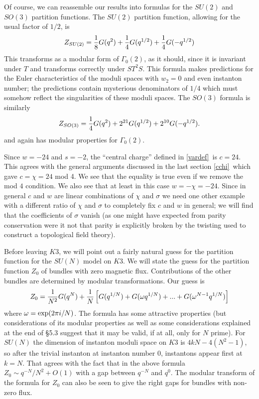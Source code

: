 \documentclass[12pt]{article}
\numberwithin{equation}{section}
\begin{document}
Of course, we can reassemble our results into formulas for the $SU(2)$
and $SO(3)$ partition functions.
The $SU(2)$ partition function, allowing for the usual factor of $1/2$,
is
%
\begin{equation}
  \label{plon}
  Z_{SU(2)}={1\over 8}G(q^2)+{1\over 4}G(q^{1/2})+ {1\over 4}G(-q^{1/2})
\end{equation}
%
This transforms as a modular form of $\Gamma_0(2)$, as it should,
since it is invariant under $T$ and transforms correctly under $ST^2S$.
This formula makes predictions for the Euler characteristics of the moduli
spaces with $w_2=0$ and even instanton number; the predictions
contain mysterious denominators of $1/4$ which must somehow
reflect the singularities of these moduli spaces.  The $SO(3)$ formula
is similarly
\begin{equation}
  \label{glon}
  Z_{SO(3)}={1\over 4}G(q^2)+2^{21}G(q^{1/2})+2^{10}G(-q^{1/2}).
\end{equation}
and again has modular properties for  $\Gamma_0(2)$.

Since $w=-24$ and $s=-2$, the ``central charge'' defined in
\eqref{vardef}\ is $c=24$.  This agrees with the
general arguments discussed in the last section \eqref{cchi}\
which gave $c=\chi=24$ mod 4.  We see that the equality
is true even if we remove the mod $4$ condition.
We also see that at least in this case $w=-\chi=-24$.  Since in
general $c$ and $w$ are linear combinations of $\chi$ and $\sigma$
we need one other example with a different
ratio of $\chi$ and $\sigma$ to completely fix $c$ and $w$ in general;
we will find that the coefficients of $\sigma$ vanish (as one might
  have expected
  from parity conservation were it not that parity is explicitly
broken by the twisting used to construct a topological field theory).

Before leaving $K3$, we will point out a fairly natural
guess for the partition function for the
$SU(N)$ model on $K3$.
We will state the guess for the partition function $Z_0$ of bundles
with zero magnetic flux.  Contributions of the other bundles are determined by
modular transformations.  Our guess is
%
$$Z_0={1\over N^2}G(q^N)+{1\over N}\left[G(q^{1/N})+G(\omega q^{1/N})+...+
G(\omega^{N-1} q^{1/N})\right]$$
%
where $\omega ={\rm exp}(2\pi i/N)$.  The formula has some attractive
properties (but considerations
  of its modular properties as well as some considerations explained
  at the end of \S5.3
suggest that it may be valid, if at all, only for $N$ prime).
For $SU(N)$ the dimension of instanton moduli space on $K3$ is
$4kN-4(N^2-1)$, so after the trivial instanton at instanton
number 0, instantons appear first at $k=N$.  That agrees with
the fact that in the above formula
$Z_0\sim q^{-N}/N^2+O(1)$ with a gap between $q^{-N}$
and $q^0$.  The modular transform of the formula for $Z_0$ can also
be seen to give the right gaps for bundles with non-zero flux.
\end{document}
